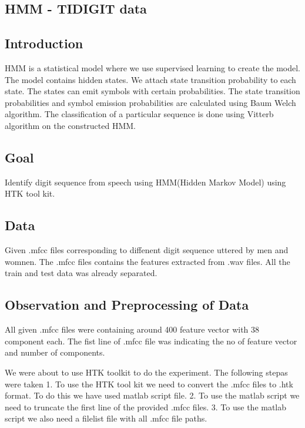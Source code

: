 \begin{center}
\section{HMM - TIDIGIT data}
\end{center}

\subsection{Introduction}
\begin{flushleft}
  HMM is a statistical model where we use supervised learning to create the model.
  The model contains hidden states. We attach state transition probability to each state.
  The states can emit symbols with certain probabilities. \break
  The state transition probabilities and 
  symbol emission probabilities are calculated using Baum Welch algorithm.
  The classification of a particular sequence is done using Vitterb algorithm on the constructed HMM.
\end{flushleft}

\subsection{Goal}
\begin{flushleft}
    Identify digit sequence from speech using HMM(Hidden Markov Model) using HTK tool kit.
\end{flushleft}

\subsection{Data}
\begin{flushleft}
  Given .mfcc files corresponding to diffenent digit sequence uttered by men and womnen.
  The .mfcc files contains the features extracted from .wav files.
  All the train and test data was already separated.
\end{flushleft}


\subsection{Observation and Preprocessing of Data}
\begin{flushleft}
    
  All given .mfcc files were containing around 400 feature vector with 38 component each.
  The fist line of .mfcc file was indicating the no of feature vector and number of components.

  We were about to use HTK toolkit to do the experiment.
  The following stepas were taken
  1. To use the HTK tool kit we need to convert the .mfcc files to .htk format. To do this we have used matlab script file.
  2. To use the matlab script we need to truncate the first line of the provided .mfcc files.
  3. To use the matlab script we also need a filelist file with all .mfcc file paths.
\end{flushleft}

